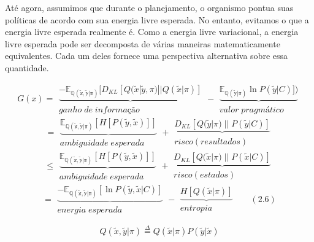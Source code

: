 \documentclass[
  12pt,
]{book}
\begin{document}
Até agora, assumimos que durante o planejamento, o organismo pontua suas políticas de acordo com sua energia livre esperada. No entanto, evitamos o que a energia livre esperada realmente é. Como a energia livre variacional, a energia livre esperada pode ser decomposta de várias maneiras matematicamente equivalentes. Cada um deles fornece uma perspectiva alternativa sobre essa quantidade.

\[G(x)=\begin{matrix} \underbrace{-\mathbb{E_{Q(\tilde x,\tilde y|\pi)}}[ D_{KL}[Q(\tilde x|\tilde y,\pi)||Q(\tilde x|\pi)] }\\ ganho\; de\; informação  \end{matrix} -  \begin{matrix} \underbrace{\mathbb{E_{Q(\tilde y|\pi)}} \ln P(\tilde y|C)])} \\ valor\;pragmático \end{matrix} \]
\[ =  \begin{matrix} \underbrace{\mathbb{E_{Q(\tilde x,\tilde y | \pi)}}[H[P(\tilde y, \tilde x)]]} \\ ambiguidade\; esperada \end{matrix} + \begin{matrix} \underbrace{D_{KL}[Q(\tilde y | \pi) \;||\; P(\tilde y | C)]} \\ risco(resultados) \end{matrix} \]
\[ \le  \begin{matrix} \underbrace{\mathbb{E_{Q(\tilde x,\tilde y | \pi)}}[ H[P(\tilde y, \tilde x)]]} \\ ambiguidade\; esperada \end{matrix} + \begin{matrix} \underbrace{D_{KL}[Q(\tilde x | \pi) \;||\; P(\tilde x | C)]} \\ risco(estados) \end{matrix} \]
\[ =  \begin{matrix} \underbrace{-\mathbb{E_{Q(\tilde x,\tilde y | \pi)}}[\ln P(\tilde y, \tilde x|C)]} \\ energia\; esperada \end{matrix} - \begin{matrix} \underbrace{H[Q(\tilde x | \pi)]} \\ entropia \end{matrix} \;\;\;\;\;\; (2.6)\]

\[ Q(\tilde x,\tilde y | \pi) \overset{\Delta}{=}  Q(\tilde x | \pi)P(\tilde y | \tilde x) \]
\end{document}
